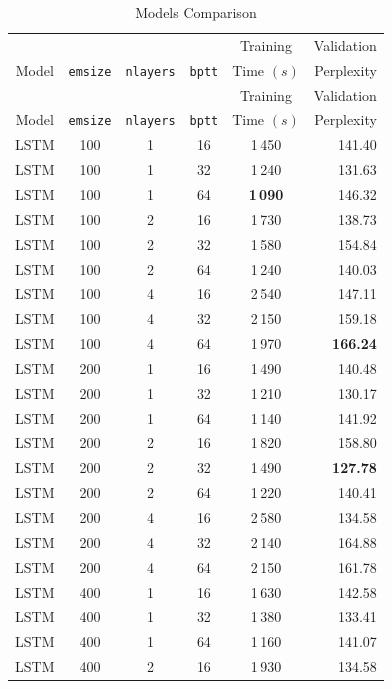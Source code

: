 \documentclass{article}
\begin{document}
\begin{itemize}
	\begin{longtable}{cccccr}
	    \caption{Models Comparison} \label{tb1} \\
		\toprule
         & & & & Training & Validation \\
		Model & \texttt{emsize} & \texttt{nlayers} & \texttt{bptt} & Time $(s)$ & Perplexity \\
		\midrule
		\endfirsthead
		\toprule
		 & & & & Training & Validation \\
		Model & \texttt{emsize} & \texttt{nlayers} & \texttt{bptt} & Time $(s)$ & Perplexity \\
		\midrule
		\endhead
        LSTM & 100 & 1 & 16 & 1\,450 & 141.40 \\
        LSTM & 100 & 1 & 32 & 1\,240 & 131.63 \\
        LSTM & 100 & 1 & 64 & \textbf{1\,090} & 146.32 \\
        LSTM & 100 & 2 & 16 & 1\,730 & 138.73 \\
        LSTM & 100 & 2 & 32 & 1\,580 & 154.84 \\
        LSTM & 100 & 2 & 64 & 1\,240 & 140.03 \\
        LSTM & 100 & 4 & 16 & 2\,540 & 147.11 \\
        LSTM & 100 & 4 & 32 & 2\,150 & 159.18 \\
        LSTM & 100 & 4 & 64 & 1\,970 & \textbf{166.24} \\
        \midrule
        LSTM & 200 & 1 & 16 & 1\,490 & 140.48 \\
        LSTM & 200 & 1 & 32 & 1\,210 & 130.17 \\
        LSTM & 200 & 1 & 64 & 1\,140 & 141.92 \\
        LSTM & 200 & 2 & 16 & 1\,820 & 158.80 \\
        LSTM & 200 & 2 & 32 & 1\,490 & \textbf{127.78} \\
        LSTM & 200 & 2 & 64 & 1\,220 & 140.41 \\
        LSTM & 200 & 4 & 16 & 2\,580 & 134.58 \\
        LSTM & 200 & 4 & 32 & 2\,140 & 164.88 \\
        LSTM & 200 & 4 & 64 & 2\,150 & 161.78 \\
        \midrule
        LSTM & 400 & 1 & 16 & 1\,630 & 142.58 \\
        LSTM & 400 & 1 & 32 & 1\,380 & 133.41 \\
        LSTM & 400 & 1 & 64 & 1\,160 & 141.07 \\
        LSTM & 400 & 2 & 16 & 1\,930 & 134.58 \\

\end{longtable}
\end{itemize}
\end{document}
